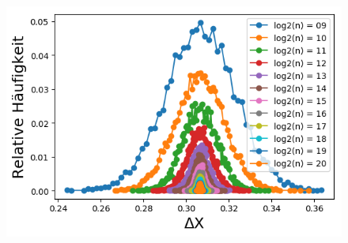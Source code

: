 \begin{figure}[H]
    \hspace*{-1cm}
    \begin{minipage}[t]{.30\textwidth}
        \centering
        \includegraphics[width=1.2\textwidth]{pictures/min_filter_D_n_4.png}
    \end{minipage}
    \hspace*{0.8cm}
    \begin{minipage}[t]{.30\textwidth}
        \centering
    \end{minipage}  
        \hspace*{0.8cm}
    \begin{minipage}[t]{.30\textwidth}

\end{minipage}
\end{figure}
